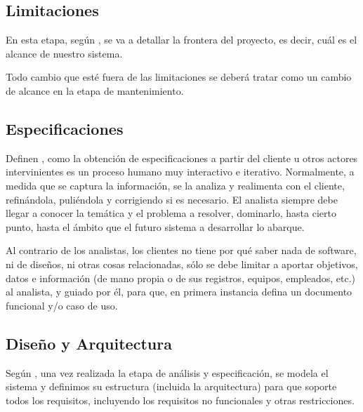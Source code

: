 \documentclass[12pt]{article}
\begin{document}
	\subsection{Limitaciones}

	\hspace{1.27cm}En esta etapa, según \textcite{maida_metodologias_2015}, se va a detallar la frontera del proyecto, es decir, cuál es el alcance de nuestro
	sistema.

	\hspace{1.27cm}Todo cambio que esté fuera de las limitaciones se deberá tratar como un cambio de alcance en la
	etapa de mantenimiento.

	\subsection{Especificaciones}

	\hspace{1.27cm}Definen \textcite{maida_metodologias_2015}, como la obtención de especificaciones a partir del cliente u otros actores intervinientes es un proceso humano muy interactivo e iterativo. Normalmente, a medida que se captura la información, se la analiza y realimenta con el cliente, refinándola, puliéndola y corrigiendo si es necesario. El analista siempre debe llegar a conocer la temática y el problema a resolver, dominarlo, hasta cierto punto, hasta el ámbito que el futuro sistema a desarrollar lo abarque.

	\hspace{1.27cm}Al contrario de los analistas, los clientes no tiene por qué saber nada de software, ni de diseños, ni otras cosas relacionadas, sólo se debe limitar a aportar objetivos, datos e información (de mano propia	o de sus registros, equipos, empleados, etc.) al analista, y guiado por él, para que, en primera instancia defina un documento funcional y/o caso de uso.

	\subsection{Diseño y Arquitectura}

	\hspace{1.27cm}Según \textcite{maida_metodologias_2015}, una vez realizada la etapa de análisis y especificación, se modela el sistema y definimos su estructura (incluida la arquitectura) para que soporte todos los requisitos, incluyendo los requisitos no funcionales y otras restricciones.
\end{document}
